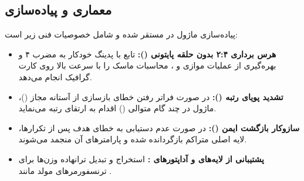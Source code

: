 \subsection{معماری و پیاده‌سازی}
پیاده‌سازی ماژول در  مستقر شده و شامل خصوصیات فنی زیر است:
\begin{itemize}
    \item \textbf{هرس برداری ۲:۴ بدون حلقه پایتونی ():} تابع  با پدینگ خودکار به مضرب ۴ و بهره‌گیری از عملیات موازی  و ، محاسبات ماسک را با سرعت بالا روی کارت گرافیک انجام می‌دهد.
    \item \textbf{تشدید پویای رتبه ():} در صورت فراتر رفتن خطای بازسازی از آستانه مجاز ()، ماژول در چند گام متوالی () اقدام به ارتقای رتبه می‌نماید.
    \item \textbf{سازوکار بازگشت ایمن ():} در صورت عدم دستیابی به خطای هدف پس از تکرارها، لایه اصلی متراکم بازگردانده شده و پارامترهای آن منجمد می‌شوند.
    \item \textbf{پشتیبانی از لایه‌های  و آداپتورهای :} استخراج و تبدیل ترانهاده وزن‌ها برای ترنسفورمرهای مولد مانند .
\end{itemize}
